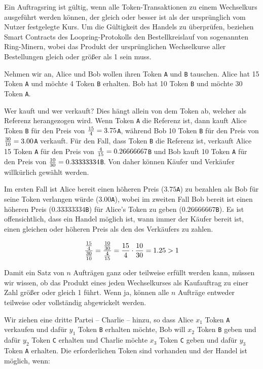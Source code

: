 \documentclass[UTF8,nofonts]{article}
\begin{document}
\begin{multicols}{2}
Ein Auftragsring ist gültig, wenn alle Token-Transaktionen zu einem Wechselkurs ausgeführt werden können, der gleich oder besser ist als der ursprünglich vom Nutzer festgelegte Kurs. Um die Gültigkeit des Handels zu überprüfen, beziehen Smart Contracts des Loopring-Protokolls den Bestellkreislauf von sogenannten Ring-Minern, wobei das Produkt der ursprünglichen Wechselkurse aller Bestellungen gleich oder größer als 1 sein muss.

Nehmen wir an, Alice und Bob wollen ihren Token \verb|A| und \verb|B| tauschen. Alice hat 15 Token \verb|A| und möchte 4 Token \verb|B| erhalten. Bob hat 10 Token \verb|B| und möchte 30 Token \verb|A|.

Wer kauft und wer verkauft? Dies hängt allein von dem Token ab, welcher als Referenz herangezogen wird. Wenn Token \verb|A| die Referenz ist, dann kauft Alice Token \verb|B| für den Preis von ${15 \over 4} = 3.75$\verb|A|, während Bob 10 Token \verb|B| für den Preis von ${30 \over 10} = 3.00$\verb|A| verkauft. Für den Fall, dass Token \verb|B| die Referenz ist, verkauft Alice 15 Token \verb|A| für den Preis von ${4\over 15}=0.26666667$\verb|B| und Bob kauft 10 Token \verb|A| für den Preis von ${10 \over 30}=0.33333334$\verb|B|. Von daher können Käufer und Verkäufer willkürlich gewählt werden.

Im ersten Fall ist Alice bereit einen höheren Preis ($3.75$\verb|A|) zu bezahlen als Bob für seine Token verlangen würde ($3.00$\verb|A|), wobei im zweiten Fall Bob bereit ist einen höheren Preis ($0.33333334$\verb|B|) für Alice's Token zu geben ($0.26666667$\verb|B|). Es ist offensichtlich, dass ein Handel möglich ist, wann immer der Käufer bereit ist, einen gleichen oder höheren Preis als den des Verkäufers zu zahlen.

\begin{equation}
{{15\over 4} \over {30\over 10}} = {{10\over 30} \over {4\over 15}}={15 \over 4} \cdot {10 \over 30} = 1.25 > 1
\end{equation}

Damit ein Satz von $n$ Aufträgen ganz oder teilweise erfüllt werden kann, müssen wir wissen, ob das Produkt eines jeden Wechselkurses als Kaufauftrag zu einer Zahl größer oder gleich 1 führt. Wenn ja, können alle $n$ Aufträge entweder teilweise oder vollständig abgewickelt werden.

Wir ziehen eine dritte Partei – Charlie – hinzu, so dass Alice $x_1$ Token \verb|A| verkaufen und dafür $y_1$ Token \verb|B| erhalten möchte, Bob will $x_2$ Token \verb|B| geben und dafür $y_2$ Token \verb|C| erhalten und Charlie möchte $x_3$ Token \verb|C| geben und dafür $y_3$ Token \verb|A| erhalten. Die erforderlichen Token sind vorhanden und der Handel ist möglich, wenn:


\end{multicols}
\end{document}
